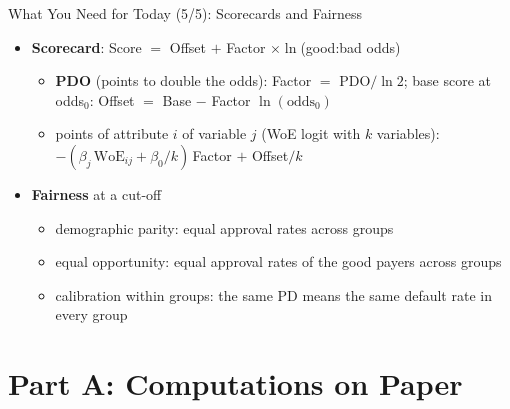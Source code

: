 \begin{frame}{What You Need for Today (5/5): Scorecards and Fairness}
\itemsize{\small}
\begin{itemize}
    \item \textbf{Scorecard}: Score $=$ Offset $+$ Factor $\times \ln$(good:bad odds) 
    \begin{itemize}
        \item \textbf{PDO} (points to double the odds): Factor $=$ PDO$/\ln 2$; base score at odds$_0$: Offset $=$ Base $-$ Factor $\ln(\text{odds}_0)$
        \item points of attribute $i$ of variable $j$ (WoE logit with $k$ variables): $-(\beta_j\,\mathrm{WoE}_{ij} + \beta_0/k)\,$Factor $+$ Offset$/k$
    \end{itemize}
    \item \textbf{Fairness} at a cut-off 
    \begin{itemize}
        \item demographic parity: equal approval rates across groups
        \item equal opportunity: equal approval rates of the good payers across groups
        \item calibration within groups: the same PD means the same default rate in every group
    \end{itemize}
\end{itemize}
\end{frame}


\section{Part A: Computations on Paper}

